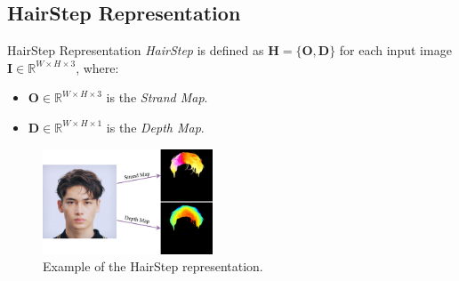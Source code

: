 
\subsection{HairStep Representation}

\begin{frame}[t]{HairStep Representation}
    \textit{HairStep} is defined as $\mathbf{H} = \{\mathbf{O}, \mathbf{D}\}$ for each input image $\mathbf{I} \in \mathbb{R}^{W \times H \times 3}$, where:
    \begin{itemize}
        \item $\mathbf{O} \in \mathbb{R}^{W \times H \times 3}$ is the \emph{Strand Map}.
        \item $\mathbf{D} \in \mathbb{R}^{W \times H \times 1}$ is the \emph{Depth Map}.
    \end{itemize}

    \begin{figure}[t]
        \centering
        \includegraphics[width=0.45\textwidth]{assets/figures/method/hairstep.png}
        \caption{Example of the HairStep representation.}
        \label{fig:hairstep_rep}
    \end{figure}
\end{frame}

